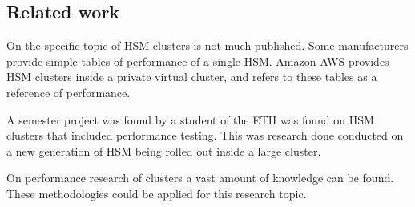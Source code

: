 \subsection*{Related work}
On the specific topic of HSM clusters is not much published.
Some manufacturers provide simple tables of performance of a single HSM.
Amazon AWS provides HSM clusters inside a private virtual cluster,
and refers to these tables as a reference of performance.

A semester project was found by a student of the ETH was found on HSM clusters that included performance testing\cite{hsmperformance}.
This was research done conducted on a new generation of HSM being rolled out inside a large cluster.

On performance research of clusters a vast amount of knowledge can be found.
These methodologies could be applied for this research topic.
